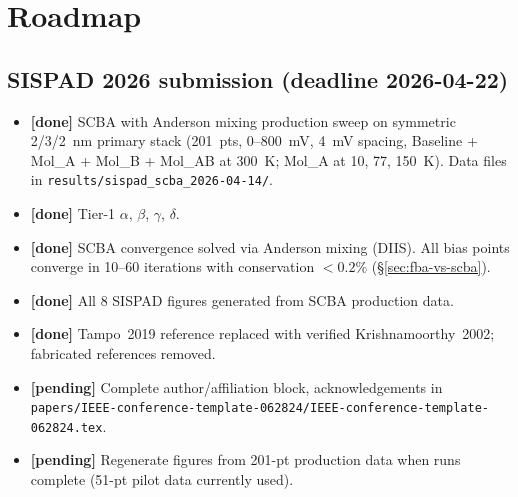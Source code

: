 \documentclass[11pt,a4paper,onecolumn]{article}
\newcommand{\code}[1]{\texttt{\small #1}}
\begin{document}
\section{Roadmap}
\label{sec:roadmap}

\subsection{SISPAD 2026 submission (deadline 2026-04-22)}
\begin{itemize}[leftmargin=1.3em,itemsep=0pt]
\item \textbf{[done]} SCBA with Anderson mixing production sweep on symmetric
2/3/2~nm primary stack (201~pts, 0--800~mV, 4~mV spacing, Baseline +
Mol\_A + Mol\_B + Mol\_AB at 300~K; Mol\_A at 10, 77, 150~K).
Data files in \code{results/sispad\_scba\_2026-04-14/}.
\item \textbf{[done]} Tier-1 $\alpha$, $\beta$, $\gamma$, $\delta$.
\item \textbf{[done]} SCBA convergence solved via Anderson mixing (DIIS).
All bias points converge in 10--60 iterations with conservation $< 0.2\%$
(\S\ref{sec:fba-vs-scba}).
\item \textbf{[done]} All 8 SISPAD figures generated from SCBA production data.
\item \textbf{[done]} Tampo~2019 reference replaced with verified
Krishnamoorthy~2002; fabricated references removed.
\item \textbf{[pending]} Complete author/affiliation block, acknowledgements
in \code{papers/IEEE-conference-template-062824/IEEE-conference-template-062824.tex}.
\item \textbf{[pending]} Regenerate figures from 201-pt production data when
runs complete (51-pt pilot data currently used).
\end{itemize}
\end{document}
